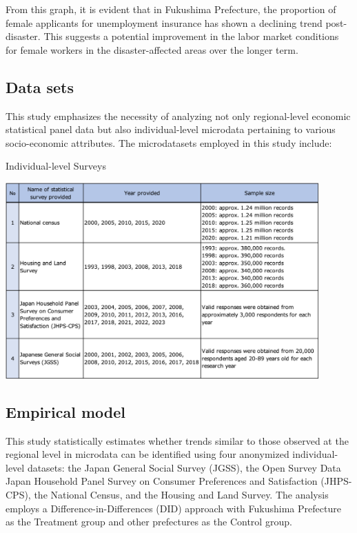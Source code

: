 \documentclass[12pt,halfline,a4paper]{ouparticle}
\begin{document}
From this graph, it is evident that in Fukushima Prefecture, the proportion of female applicants for unemployment insurance has shown a declining trend post-disaster. This suggests a potential improvement in the labor market conditions for female workers in the disaster-affected areas over the longer term.

\newpage

\subsection{Data sets}
\label{sec5.1}

This study emphasizes the necessity of analyzing not only regional-level economic statistical panel data but also individual-level microdata pertaining to various socio-economic attributes. The microdatasets employed in this study include:

\begin{table}[h]
    \centering
    \caption{Individual-level Surveys}
    \label{tab:annual_income}
    \includegraphics[width=0.9\textwidth]{Statistical surveys.png}  %
\end{table}

\subsection{Empirical model}
\label{sec5.1}

This study statistically estimates whether trends similar to those observed at the regional level in microdata can be identified using four anonymized individual-level datasets: the Japan General Social Survey (JGSS), the Open Survey Data Japan Household Panel Survey on Consumer Preferences and Satisfaction (JHPS-CPS), the National Census, and the Housing and Land Survey. The analysis employs a Difference-in-Differences (DID) approach with Fukushima Prefecture as the Treatment group and other prefectures as the Control group.
\end{document}
